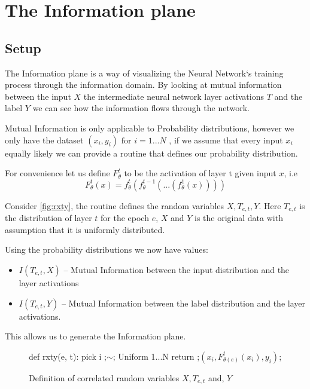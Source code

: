 \documentclass[dissertation.tex]{subfiles}
\begin{document}
\section{The Information plane}
\label{sec:IP}

\subsection{Setup}

The Information plane is a way of visualizing the Neural Network`s training
process through the information domain. By looking at mutual information between
the input $X$ the intermediate neural network layer activations $T$ and the
label $Y$ we can see how the information flows through the network.

Mutual Information is only applicable to Probability distributions, however we
only have the dataset $(x_i, y_i) \text{ for } i = 1...N$ , if we assume that
every input $x_i$ equally likely we can provide a routine that defines our
probability distribution.

For convenience let us define $F_{\theta}^t$ to be the activation of layer t given
input $x$, i.e
\begin{equation}
  F_{\theta}^t(x) = f_{\theta}^t(f_{\theta}^{t-1}(...(f_{\theta}^1(x))))
  \label{eq:bigF}
\end{equation}


Consider \autoref{fig:rxty}, the routine defines the random variables
$X,T_{e,t},Y$. Here $T_{e,t}$ is the distribution of layer $t$ for the epoch $e$,
$X$ and $Y$ is the original data with assumption that it is uniformly
distributed. 

Using the probability distributions we now have values:
\begin{itemize}
  \item{
      $I(T_{e,t}, X)$ -- Mutual Information between the input distribution and the
      layer activations 
    }
  \item{
      $I(T_{e,t}, Y)$ -- Mutual Information between the label distribution and the
      layer activations.
    }
\end{itemize}
This allows us to generate the Information plane.


\begin{figure}[H]
    \begin{pythonfigure}
      def rxty(e, t):
        pick i ;$\sim$; Uniform {1...N}
        return ;$(x_i, F_{\theta(e)}^t(x_i), y_i)$;
    \end{pythonfigure}
    \caption{Definition of correlated random variables $X, T_{e,t}$ and, $Y$}
    \label{fig:rxty}
\end{figure}
\end{document}
